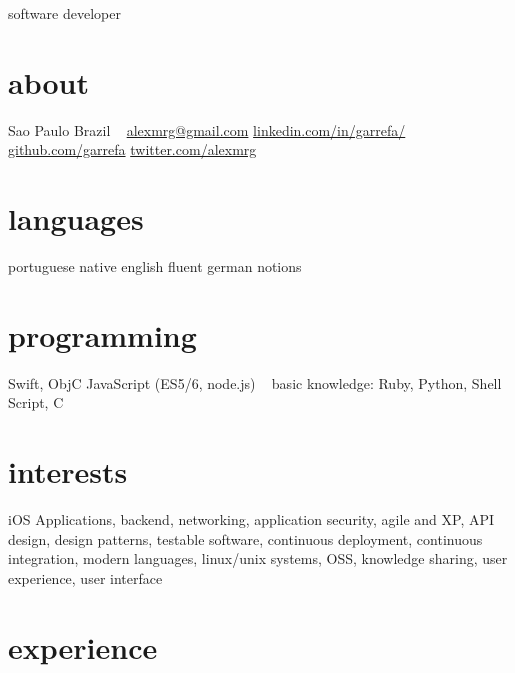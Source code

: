 \documentclass[]{friggeri-cv}
\begin{document}
       {software developer}

\begin{aside}
  \section{about}
    Sao Paulo
    Brazil
    ~
    \href{mailto:alexmrg@gmail.com}{alexmrg@gmail.com}
    \href{https://linkedin.com/in/garrefa/}{linkedin.com/in/garrefa/}
    \href{https://github.com/garrefa}{github.com/garrefa}
    \href{https://twitter.com/alexmrg}{twitter.com/alexmrg}
  \section{languages}
    portuguese native
    english fluent
    german notions
  \section{programming}
    Swift, ObjC
    JavaScript
    (ES5/6, node.js)
    ~
    basic knowledge:
    Ruby, Python, Shell Script, C
\end{aside}

\section{interests}

iOS Applications, backend, networking, application security, agile and XP, API design, design patterns, testable software, continuous deployment, continuous integration, modern languages, linux/unix systems, OSS, knowledge sharing, user experience, user interface

\section{experience}
\end{document}

